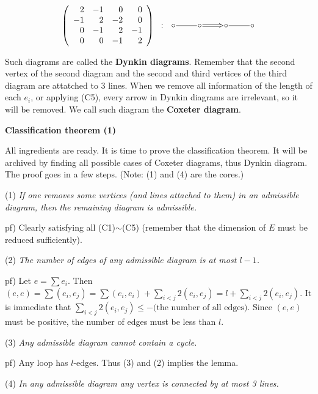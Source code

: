 \documentclass{article}
\begin{document}
\begin{displaymath}
  \left( \begin{array}{rrrr}
     2 & -1 &  0 &  0 \\
    -1 &  2 & -2 &  0 \\
     0 & -1 &  2 & -1 \\
     0 &  0 & -1 &  2
  \end{array} \right)
  \;\; : \;\; 
  \xymatrix@1{\circ \ar@{-}[r] & \circ \ar@2{->}[r] & \circ \ar@{-}[r] & \circ}
\end{displaymath}

Such diagrams are called the \textbf{Dynkin diagrams}.
Remember that the second vertex of the second diagram and the second and third vertices of the third diagram are attatched to 3 lines.
When we remove all information of the length of each $e_i$, or applying (C5), every arrow in Dynkin diagrams are irrelevant, so it will be removed.
We call such diagram the \textbf{Coxeter diagram}.

\newpage

\textbf{Classification theorem (1)}

All ingredients are ready.
It is time to prove the classification theorem.
It will be archived by finding all possible cases of Coxeter diagrams, thus Dynkin diagram.
The proof goes in a few steps.
(Note: (1) and (4) are the cores.)

(1) \textit{If one removes some vertices (and lines attached to them) in an admissible diagram, then the remaining diagram is admissible.}

pf) Clearly satisfying all (C1)$\sim$(C5) (remember that the dimension of $E$ must be reduced sufficiently).

(2) \textit{The number of edges of any admissible diagram is at most $l - 1$.}

pf) Let $e = \sum e_i$.
Then $(e, e) = \sum (e_i, e_j) = \sum (e_i, e_i) + \sum_{i < j} 2(e_i, e_j) = l + \sum_{i < j} 2(e_i, e_j)$.
It is immediate that $\sum_{i < j} 2(e_i, e_j) \le -\textrm{(the number of all edges)}$.
Since $(e, e)$ must be positive, the number of edges must be less than $l$.

(3) \textit{Any admissible diagram cannot contain a cycle.}

pf) Any loop has $l$-edges.
Thus (3) and (2) implies the lemma.

(4) \textit{In any admissible diagram any vertex is connected by at most 3 lines.}
\end{document}
